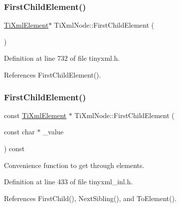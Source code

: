 \hypertarget{class_ti_xml_node_aa0fecff1f3866ab33a8a25506e95db1d}{}\label{class_ti_xml_node_aa0fecff1f3866ab33a8a25506e95db1d} 
\subsubsection{\texorpdfstring{First\+Child\+Element()}{FirstChildElement()}\hspace{0.1cm}{\footnotesize\ttfamily [2/6]}}
{\footnotesize\ttfamily \hyperlink{class_ti_xml_element}{Ti\+Xml\+Element}$\ast$ Ti\+Xml\+Node\+::\+First\+Child\+Element (\begin{DoxyParamCaption}{ }\end{DoxyParamCaption})\hspace{0.3cm}{\ttfamily [inline]}}



Definition at line 732 of file tinyxml.\+h.



References First\+Child\+Element().

\hypertarget{class_ti_xml_node_aab23fca4c2455c1d926c35d85a663842}{}\label{class_ti_xml_node_aab23fca4c2455c1d926c35d85a663842} 
\subsubsection{\texorpdfstring{First\+Child\+Element()}{FirstChildElement()}\hspace{0.1cm}{\footnotesize\ttfamily [3/6]}}
{\footnotesize\ttfamily const \hyperlink{class_ti_xml_element}{Ti\+Xml\+Element} $\ast$ Ti\+Xml\+Node\+::\+First\+Child\+Element (\begin{DoxyParamCaption}\item[{const char $\ast$}]{\+\_\+value }\end{DoxyParamCaption}) const}



Convenience function to get through elements. 



Definition at line 433 of file tinyxml\+\_\+inl.\+h.



References First\+Child(), Next\+Sibling(), and To\+Element().

